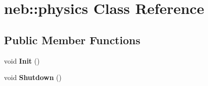\hypertarget{classneb_1_1physics}{
\section{neb::physics Class Reference}
\label{classneb_1_1physics}
}
\subsection*{Public Member Functions}
\begin{DoxyCompactItemize}
\item 
\hypertarget{classneb_1_1physics_a43cb026789894c6dda3657f83a2cb8d1}{
void {\bfseries Init} ()}
\label{classneb_1_1physics_a43cb026789894c6dda3657f83a2cb8d1}

\item 
\hypertarget{classneb_1_1physics_a24efe8826dbb2b6fa42ee21360123834}{
void {\bfseries Shutdown} ()}
\label{classneb_1_1physics_a24efe8826dbb2b6fa42ee21360123834}

\end{DoxyCompactItemize}
